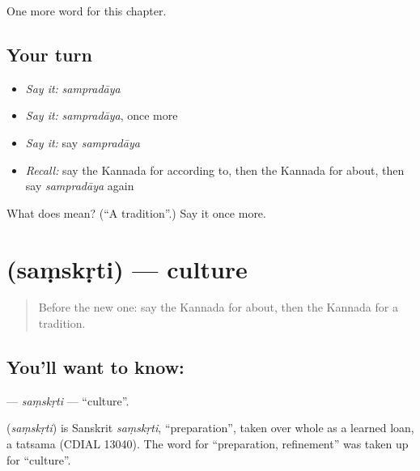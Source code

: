 \begin{grammarlens}[title={What you've built}]
One more word for this chapter.
\end{grammarlens}

\subsection*{Your turn}
\begin{itemize}
\raggedright
  \item \emph{Say it:} \emph{sampradāya}
  \item \emph{Say it:} \emph{sampradāya}, once more
  \item \emph{Say it:} say \emph{sampradāya}
  \item \emph{Recall:} say the Kannada for according to, then the Kannada for about, then say \emph{sampradāya} again
\end{itemize}

\begin{tcolorbox}[breakable,colback=teal!4,colframe=teal!35!black,title={Before you move on}]
What does  mean? (\textquotedblleft{}A tradition\textquotedblright{}.) Say it once more.
\end{tcolorbox}
\section[\texorpdfstring{\kn{ಸಂಸ್ಕೃತಿ} (saṃskṛti)}{ಸಂಸ್ಕೃತಿ (saṃskṛti)}]{ (saṃskṛti) — culture}

\label{lesson:KA-C215-samskrti}



\begin{quote}
Before the new one: say the Kannada for about, then the Kannada for a tradition.
\end{quote}

\subsection*{You'll want to know: }
\textbf{} — \emph{saṃskṛti} — \textquotedblleft{}culture\textquotedblright{}.

\begin{cousinweb}
\textbf{} (\emph{saṃskṛti}) is Sanskrit \emph{saṃskṛti}, \textquotedblleft{}preparation\textquotedblright{}, taken over whole as a learned loan, a tatsama (CDIAL 13040). The word for \textquotedblleft{}preparation, refinement\textquotedblright{} was taken up for \textquotedblleft{}culture\textquotedblright{}.
\end{cousinweb}


